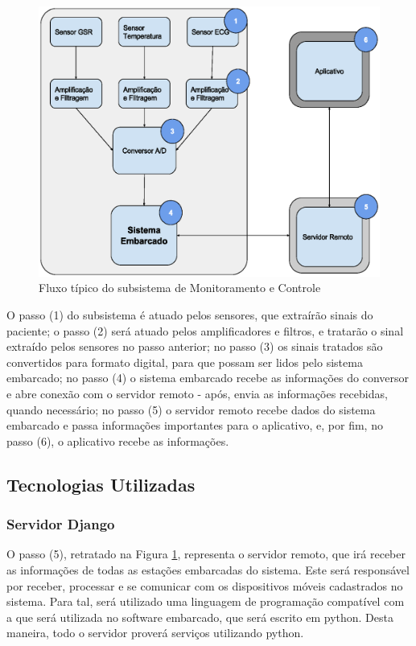 \begin{figure}[H]
  \centering
    \includegraphics[width=\textwidth]{figuras/arquitetura-monitoramentoecontrole.eps}
  \caption{Fluxo típico do subsistema de Monitoramento e Controle}
  \label{fig:arquitetura-monitoramento-e-controle}
\end{figure}

O passo (1) do subsistema é atuado pelos sensores, que extraírão sinais do paciente;
o passo (2) será atuado pelos amplificadores e filtros, e tratarão o sinal
extraído pelos sensores no passo anterior; no passo (3) os sinais tratados
são convertidos para formato digital, para que possam ser lidos pelo sistema
embarcado; no passo (4) o sistema embarcado recebe as informações do conversor
e abre conexão com o servidor remoto - após, envia as informações recebidas,
quando necessário; no passo (5) o servidor remoto recebe dados do sistema
embarcado e passa informações importantes para o aplicativo, e, por fim,
no passo (6), o aplicativo recebe as informações.

\subsection{Tecnologias Utilizadas}

\subsubsection{Servidor Django}
\label{sub:servidor_django}
O passo (5), retratado na Figura \ref{fig:arquitetura-monitoramento-e-controle},
representa o servidor remoto, que irá receber as informações de todas as
estações embarcadas do sistema. Este será responsável por receber, processar
e se comunicar com os dispositivos móveis cadastrados no sistema. Para tal,
será utilizado uma linguagem de programação compatível com a que será utilizada
no software embarcado, que será escrito em python. Desta maneira, todo
o servidor proverá serviços utilizando python.

